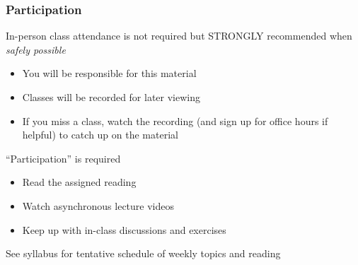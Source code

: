 \documentclass{beamer}
\begin{document}
\begin{frame}\frametitle{Participation}
    In-person class attendance is not required but STRONGLY recommended when \emph{safely possible}
    \begin{itemize}
        \item You will be responsible for this material
        \item Classes will be recorded for later viewing
        \item If you miss a class, watch the recording (and sign up for office hours if helpful) to catch up on the material
    \end{itemize}
    \vspace{2ex}
    ``Participation'' is required
    \begin{itemize}
        \item Read the assigned reading
        \item Watch asynchronous lecture videos
        \item Keep up with in-class discussions and exercises
    \end{itemize}
    \vspace{2ex}
    See syllabus for tentative schedule of weekly topics and reading
\end{frame}
\end{document}
